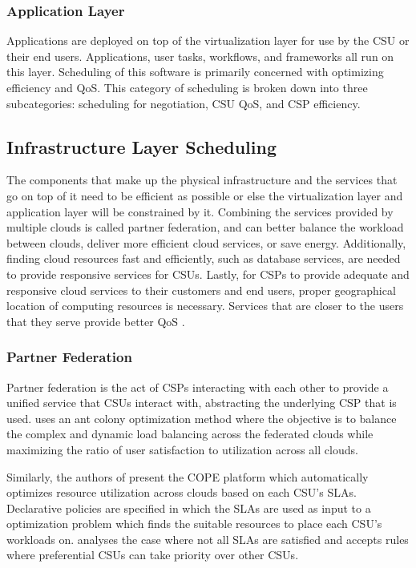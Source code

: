\documentclass[12pt]{article}
\begin{document}
\subsubsection{Application Layer}

Applications are deployed on top of the virtualization layer for use by the CSU or their end users. Applications, user tasks, workflows, and frameworks all run on this layer. Scheduling of this software is primarily concerned with optimizing efficiency and QoS. This category of scheduling is broken down into three subcategories: scheduling for negotiation, CSU QoS, and CSP efficiency.




\subsection{Infrastructure Layer Scheduling} \label{sub:infra-sched}

The components that make up the physical infrastructure and the services that go on top of it need to be efficient as possible or else the virtualization layer and application layer will be constrained by it. Combining the services provided by multiple clouds is called partner federation, and can better balance the workload between clouds, deliver more efficient cloud services, or save energy. Additionally, finding cloud resources fast and efficiently, such as database services, are needed to provide responsive services for CSUs. Lastly, for CSPs to provide adequate and responsive cloud services to their customers and end users, proper geographical location of computing resources is necessary. Services that are closer to the users that they serve provide better QoS \cite{zhan2015cloud}.


\subsubsection{Partner Federation}

Partner federation is the act of CSPs interacting with each other to provide a unified service that CSUs interact with, abstracting the underlying CSP that is used. \cite{zhang2010load} uses an ant colony optimization method where the objective is to balance the complex and dynamic load balancing across the federated clouds while maximizing the ratio of user satisfaction to utilization across all clouds.


Similarly, the authors of \cite{liu2011declarative} present the COPE platform which automatically optimizes resource utilization across clouds based on each CSU's SLAs. Declarative policies are specified in which the SLAs are used as input to a optimization problem which finds the suitable resources to place each CSU's workloads on. \cite{macias2012client} analyses the case where not all SLAs are satisfied and accepts rules where preferential CSUs can take priority over other CSUs.
\end{document}
